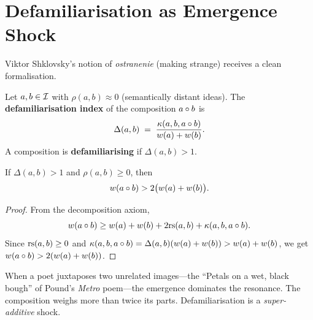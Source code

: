 \section{Defamiliarisation as Emergence Shock}
\label{sec:defamiliarisation}

Viktor Shklovsky's notion of \emph{ostranenie} (making strange)
receives a clean formalisation.

\begin{definition}
\label{def:defamiliarisation}
Let $a,b \in \mathcal{I}$ with $\rho(a,b) \approx 0$ (semantically
distant ideas).  The \textbf{defamiliarisation index} of the
composition $a \circ b$ is
\[
  \Delta(a,b)
  \;=\;
  \frac{\kappa(a,b,a\circ b)}{w(a)+w(b)}.
\]
A composition is \textbf{defamiliarising} if $\Delta(a,b) > 1$.
\end{definition}

\begin{theorem}
\label{thm:defam-weight}
If $\Delta(a,b)>1$ and $\rho(a,b) \ge 0$, then
\[
  w(a \circ b) > 2\bigl(w(a)+w(b)\bigr).
\]
\end{theorem}

\begin{proof}
From the decomposition axiom,
\[
  w(a\circ b)
  \ge w(a) + w(b) + 2\mathrm{rs}(a,b) + \kappa(a,b,a\circ b).
\]
Since $\mathrm{rs}(a,b)\ge 0$ and $\kappa(a,b,a\circ b) =
\Delta(a,b)(w(a)+w(b)) > w(a)+w(b)$, we get
$w(a\circ b) > 2(w(a)+w(b))$.
\end{proof}

\begin{interpretation}
When a poet juxtaposes two unrelated images---the ``Petals on a wet,
black bough'' of Pound's \emph{Metro} poem---the emergence dominates
the resonance.  The composition weighs more than twice its parts.
Defamiliarisation is a \emph{super-additive} shock.
\end{interpretation}


